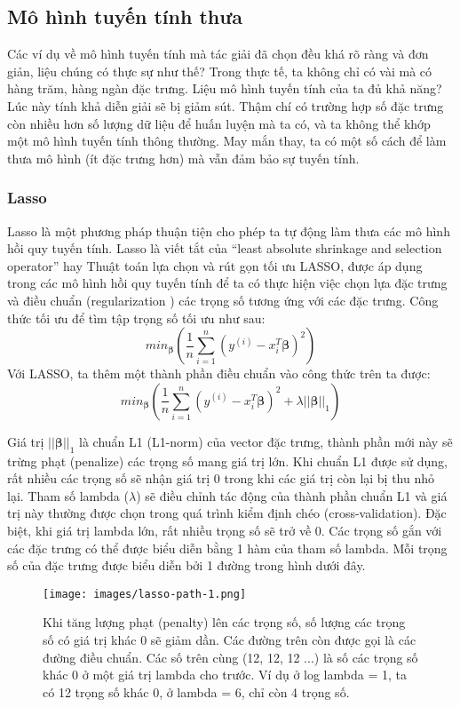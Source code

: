 \subsection{Mô hình tuyến tính thưa}
Các ví dụ về mô hình tuyến tính mà tác giải đã chọn đều khá rõ ràng và đơn giản, liệu chúng có thực sự như thế? Trong thực tế, ta không chỉ có vài mà có hàng trăm, hàng ngàn đặc trưng. Liệu mô hình tuyến tính của ta đủ khả năng? Lúc này tính khả diễn giải sẽ bị giảm sút. Thậm chí có trường hợp số đặc trưng còn nhiều hơn số lượng dữ liệu để huấn luyện mà ta có, và ta không thể khớp một mô hình tuyến tính thông thường. May mắn thay, ta có một số cách để làm thưa mô hình (ít đặc trưng hơn) mà vẫn đảm bảo sự tuyến tính.

\subsubsection{Lasso}
Lasso là một phương pháp thuận tiện cho phép ta tự động làm thưa các mô hình hồi quy tuyến tính. Lasso là viết tắt của ``least absolute shrinkage and selection operator'' hay Thuật toán lựa chọn và rút gọn tối ưu LASSO, được áp dụng trong các mô hình hồi quy tuyến tính để ta có thực hiện việc chọn lựa đặc trưng và điều chuẩn (regularization ) các trọng số tương ứng với các đặc trưng. Công thức tối ưu để tìm tập trọng số tối ưu như sau:
$$min_{\boldsymbol{\beta}}\left(\frac{1}{n}\sum_{i=1}^n(y^{(i)}-x_i^T\boldsymbol{\beta})^2\right)$$
Với LASSO, ta thêm một thành phần điều chuẩn vào công thức trên ta được:
$$min_{\boldsymbol{\beta}}\left(\frac{1}{n}\sum_{i=1}^n(y^{(i)}-x_{i}^T\boldsymbol{\beta})^2+\lambda||\boldsymbol{\beta}||_1\right)$$

Giá trị $||\boldsymbol{\beta}||_1$ là chuẩn L1 (L1-norm) của vector đặc trưng, thành phần mới này sẽ trừng phạt (penalize) các trọng số mang giá trị lớn. Khi chuẩn L1 được sử dụng, rất nhiều các trọng số sẽ nhận giá trị 0 trong khi các giá trị còn lại bị thu nhỏ lại. Tham số lambda ($\lambda$) sẽ điều chỉnh tác động của thành phần chuẩn L1 và giá trị này thường được chọn trong quá trình kiểm định chéo (cross-validation). Đặc biệt, khi giá trị lambda lớn, rất nhiều trọng số sẽ trở về 0. Các trọng số gắn với các đặc trưng có thể được biểu diễn bằng 1 hàm của tham số lambda. Mỗi trọng số của đặc trưng được biểu diễn bởi 1 đường trong hình dưới đây.

\begin{figure*}[h!]
	\centering
	\texttt{[image: images/lasso-path-1.png]}
	\label{fig:4_1_5}
	\caption{Khi tăng lượng phạt (penalty) lên các trọng số, số lượng các trọng số có giá trị khác 0 sẽ giảm dần. Các đường trên còn được gọi là các đường điều chuẩn. Các số trên cùng (12, 12, 12 ...) là số các trọng số khác 0 ở một giá trị lambda cho trước. Ví dụ ở log lambda = 1, ta có 12 trọng số khác 0, ở lambda = 6, chỉ còn 4 trọng số.}
\end{figure*}

